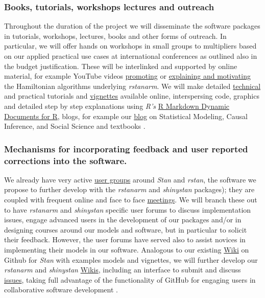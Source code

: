 \documentclass[11pt,notitlepage]{article}
\begin{document}
\subsubsection*{Books, tutorials, workshops lectures and outreach}
Throughout the duration of the project we will disseminate the software packages in tutorials, workshops, lectures, books and other forms of outreach. In particular, we will offer hands on workshops in small groups to multipliers based on our applied practical use cases at international conferences as outlined also in the budget justification. These will be interlinked and supported by online material, for example YouTube videos \href{https://www.youtube.com/watch?v=pWow8Qe1snQ}{promoting} or \href{https://www.youtube.com/watch?v=pHsuIaPbNbY}{explaining and motivating} the Hamiltonian algorithms underlying \textit{rstanarm}. We will make detailed \href{http://mc-stan.org/documentation/}{technical} and practical tutorials and \href{https://cran.r-project.org/web/packages/rstanarm/vignettes/aov.html}{vignettes} available online, interspersing code, graphics and detailed step by step explanations using \textit{R's}  \href{http://rmarkdown.rstudio.com/}{R Markdown \- Dynamic Documents for R}, blogs, for example our \href{http://andrewgelman.com/}{blog} on Statistical Modeling, Causal Inference, and Social Science and textbooks \cite{Gelman-Hill_2014}. 
\subsubsection*{Mechanisms for incorporating feedback and user reported corrections into the software.}



We already have very active \href{https://groups.google.com/forum/#!forum/stan-users} {user groups} around \textit{Stan} and \textit{rstan}, the software we propose to further develop with the \textit{rstanarm} and \textit{shinystan} packages); they are coupled with frequent online and face to face \href{http://www.meetup.com/bda-group/}{meetings}. We will branch these out to have \textit{rstanarm} and \textit{shinystan} specific user forums to discuss implementation issues, engage advanced users in the development of our packages and/or in designing courses around our models and software, but in particular to solicit their feedback. However, the user forums have served also to assist novices in implementing their models in our software.
Analogous to our existing \href{https://github.com/stan-dev/example-models/wiki}{Wiki} on Github for \textit{Stan} with examples models and vignettes, we will further develop our \textit{rstanarm} and \textit{shinystan} \href{https://github.com/stan-dev/rstanarm/wiki}{Wikis}, including an interface to submit and discuss \href{https://github.com/stan-dev/rstanarm/issues}{issues}, taking full advantage of the functionality of GitHub for engaging users in collaborative software development \cite{loeliger2012version}. 
\end{document}
